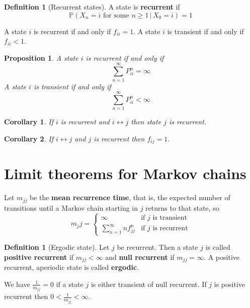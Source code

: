 \documentclass[10pt, oneside, reqno]{amsart}
\theoremstyle{plain}%
\newtheorem{prop}[thm]{Proposition}
\newtheorem*{cor}{Corollary}
\theoremstyle{definition}
\newtheorem{defn}[thm]{Definition}
\theoremstyle{remark}
\newcommand{\prob}[1]{\mathbb{P}(#1)}
\newcommand{\given}{ \, | \,}
\begin{document}
\begin{defn}[Recurrent states]
    A state is \textbf{recurrent} if \[
        \prob{X_n = i \text{ for some } n \geq 1 \given X_0 = i} = 1
    \]
    
    A state $i$ is recurrent if and only if $f_{ii} = 1$.  A state $i$ is transient if and only if $f_{ii} < 1$.
\end{defn}

\begin{prop}
    A state $i$ is recurrent if and only if \[
        \sum_{n=1}^\infty P^n_{ii} = \infty
    \]
A state $i$ is transient if and only if \[
    \sum_{n=1}^\infty P^n_{ii} < \infty
\]
\end{prop}

\begin{cor}
    If $i$ is recurrent and $i \leftrightarrow j$ then state $j$ is recurrent.
\end{cor}

\begin{cor}
    If $i \leftrightarrow j$ and $j$ is recurrent then $f_{ij} = 1$.
\end{cor}

\section{Limit theorems for Markov chains} %
\label{sub:limit_theorems_for_markov_chains}

Let $m_{jj}$ be the \textbf{mean recurrence time}, that is, the expected number of transitions until a Markov chain starting in $j$ returns to that state, so \[
    m_jj = \begin{cases}
         \infty &\text{if $j$ is transient} \\
                            \sum_{n=1}^\infty n f^n_{jj} &\text{if $j$ is recurrent}
    \end{cases}
\]

\begin{defn}[Ergodic state]
    Let $j$ be recurrent.  Then a state $j$ is called \textbf{positive recurrent} if $m_{jj} < \infty$ and \textbf{null recurrent} if $m_{jj} = \infty$.  A positive recurrent, aperiodic state is called \textbf{ergodic}.
\end{defn}

We have $\frac{1}{m_{jj}} = 0$ if a state $j$ is either transient of null recurrent.  If $j$ is positive recurrent then $0 < \frac{1}{m_{jj}} < \infty$. 
\end{document}
